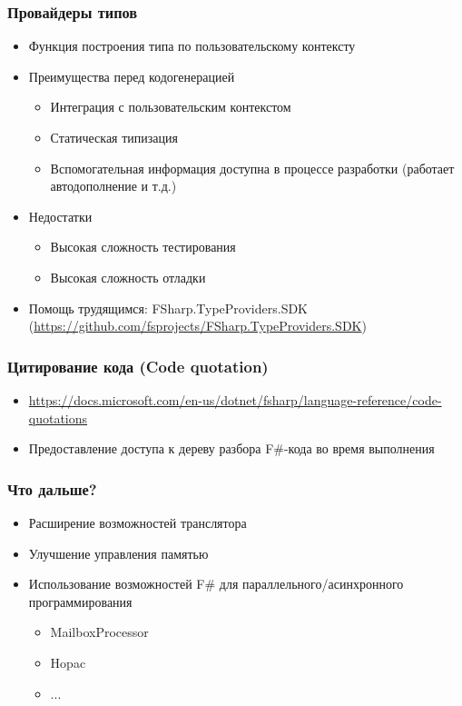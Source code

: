 \documentclass[xcolor=table]{beamer}
\begin{document}
\begin{frame}[fragile]
  \transwipe[direction=90]
  \frametitle{Провайдеры типов}
  \begin {itemize}
  \item Функция построения типа по пользовательскому контексту
  \item Преимущества перед кодогенерацией
  \begin {itemize}
   \item Интеграция с пользовательским контекстом
   \item Статическая типизация
   \item Вспомогательная информация доступна в процессе разработки (работает автодополнение и т.д.)
  \end {itemize}

  \item Недостатки
  \begin {itemize}
    \item Высокая сложность тестирования
    \item Высокая сложность отладки
  \end {itemize}
  \item Помощь трудящимся: FSharp.TypeProviders.SDK (\url{https://github.com/fsprojects/FSharp.TypeProviders.SDK})
\end {itemize}
\end{frame}

\begin{frame}[fragile]
  \transwipe[direction=90]
  \frametitle{Цитирование кода (Code quotation)}
  \begin{itemize}
  \item \url{https://docs.microsoft.com/en-us/dotnet/fsharp/language-reference/code-quotations}
  \item Предоставление доступа к дереву разбора F\#-кода во время выполнения
  \end{itemize}
\end{frame}

\begin{frame}
  \transwipe[direction=90]
  \frametitle{Что дальше?}
\begin{itemize} 
\item Расширение возможностей транслятора
\item Улучшение управления памятью
\item Использование возможностей F\# для параллельного/асинхронного программирования
\begin{itemize} 
  \item MailboxProcessor
  \item Hopac
  \item ...
\end{itemize}
\end{itemize}

\end{frame}
\end{document}
